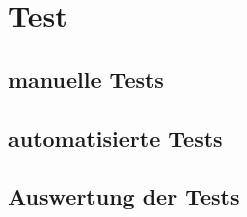 
\section{Test}

\subsection{manuelle Tests}
\subsection{automatisierte Tests}
\subsection{Auswertung der Tests}